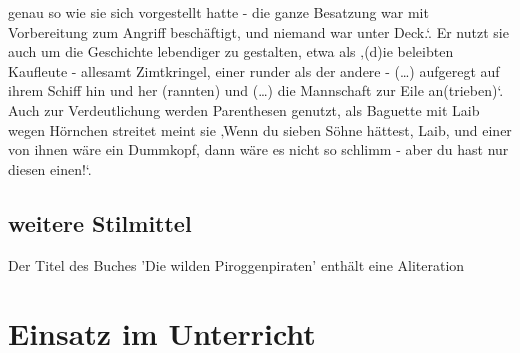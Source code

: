 genau so wie sie sich vorgestellt hatte - die ganze Besatzung war mit Vorbereitung zum Angriff beschäftigt, und niemand war unter Deck.‘.\cite[S.257]{pir} Er nutzt sie auch um die Geschichte lebendiger zu gestalten, etwa als ‚(d)ie beleibten Kaufleute - allesamt Zimtkringel, einer runder als der andere - (…) aufgeregt auf ihrem Schiff hin und her (rannten) und (…) die Mannschaft zur Eile an(trieben)‘.\cite[S.52]{pir} Auch zur Verdeutlichung werden Parenthesen genutzt, als Baguette mit Laib wegen Hörnchen streitet \cite[S.87]{pir} meint sie ‚Wenn du sieben Söhne hättest, Laib, und einer von ihnen wäre ein Dummkopf, dann wäre es nicht so schlimm - aber du hast nur diesen einen!‘.\cite[S.87]{pir}

\subsection{weitere Stilmittel}

Der Titel des Buches 'Die wilden Piroggenpiraten' enthält eine Aliteration

\section{Einsatz im Unterricht}

